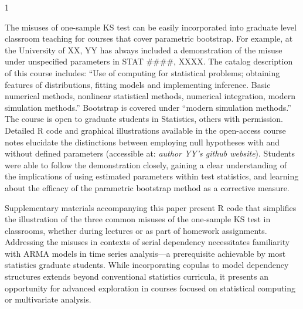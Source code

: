 \documentclass[12pt, letterpaper]{article}
\newcommand{\blind}{1}
\begin{document}
\blind
{
The misuses of one-sample KS test can be easily incorporated into graduate level
classroom teaching for courses that cover parametric bootstrap. For example, at
the University of XX, YY has always included a demonstration of the misuse under 
unspecified parameters in STAT $\#\#\#\#$, XXXX. The
catalog description of this course includes: ``Use of computing for statistical
problems; obtaining features of distributions, fitting models and implementing
inference. Basic numerical methods, nonlinear statistical methods, numerical
integration, modern simulation methods.'' Bootstrap is covered under ``modern
simulation methods.''  The course is open to graduate students in Statistics,
others with permission. Detailed R code and graphical illustrations available in
the open-access course notes elucidate the distinctions between employing null
hypotheses with and without defined parameters (accessible at: 
\textit{author YY's github website}).
Students were able to follow the demonstration closely, gaining a clear
understanding of the implications of using estimated parameters within test
statistics, and learning about the efficacy of the parametric bootstrap method
as a corrective measure.


Supplementary materials accompanying this paper present R code that simplifies
the illustration of the three common misuses of the one-sample KS test in
classrooms, whether during lectures or as part of homework assignments.
Addressing the misuses in contexts of serial dependency necessitates familiarity
with ARMA models in time series analysis---a prerequisite achievable by most
statistics graduate students. While incorporating copulas to model dependency
structures extends beyond conventional statistics curricula, it presents an
opportunity for advanced exploration in courses focused on statistical computing
or multivariate analysis. 


}
\end{document}
